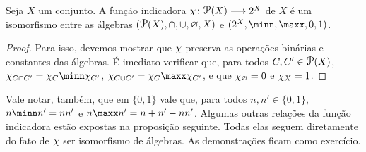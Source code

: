 \begin{prop}
Seja $X$ um conjunto. A função indicadora $\idc\colon \p(X) \to 2^X$ de $X$ é um isomorfismo entre as álgebras $(\p(X),\cap,\cup,\emptyset,X)$ e $(2^X,\minn,\maxx,0,1)$.
\end{prop}
\begin{proof}
Para isso, devemos mostrar que $\chi$ preserva as operações binárias e constantes das álgebras. É imediato verificar que, para todos $C,C' \in \p(X)$, $\idc_{C \cap C'} = \idc_C \minn \idc_{C'}$, $\idc_{C \cup C'} = \idc_C \maxx \idc_{C'}$, e que $\chi_\varnothing = 0$ e $\chi_X = 1$.
\end{proof}

Vale notar, também, que em $\{0,1\}$ vale que, para todos $n,n' \in \{0,1\}$, $n \minn n' = nn'$ e $n \maxx n' = n+n'-nn'$. Algumas outras relações da função indicadora estão expostas na proposição seguinte. Todas elas seguem diretamente do fato de $\chi$ ser isomorfismo de álgebras. As demonstrações ficam como exercício.


